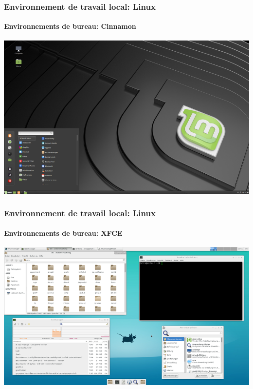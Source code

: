 \documentclass{beamer}
\begin{document}
\begin{frame}
\frametitle{Environnement de travail local: Linux}
\framesubtitle{Environnements de bureau: Cinnamon}

\begin{center}
	\includegraphics[height=
.8\textheight]{../img/Bweb01-environnement/cinnamon.png}
\end{center}

\end{frame}

\begin{frame}
\frametitle{Environnement de travail local: Linux}
\framesubtitle{Environnements de bureau: XFCE}

\begin{center}
	\includegraphics[height=
.8\textheight]{../img/Bweb01-environnement/xfce.png}
\end{center}

\end{frame}
\end{document}
